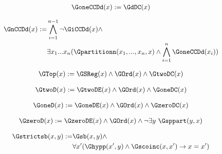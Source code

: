 \begin{erin}
    \begin{align*}
        \GoneCCDd(x) := \GdDC(x)
    \end{align*}
\end{erin}

\begin{erin}
    \begin{align*}
        \GnCCDd(x) := &\bigwedge_{i=1}^{n-1} \neg\GiCCDd(x) \wedge\\
                    &\exists x_{1}...x_{n}(\Gpartitionn(x_{1},...,x_{n},x)
                    \wedge \bigwedge_{i=1}^{n} \GoneCCDd(x_{i}))
    \end{align*}
\end{erin}

\begin{erin}
    \begin{align*}
        \GTop(x) := \GSReg(x) \wedge \GOrd(x) \wedge \GtwoDC(x)
    \end{align*}
\end{erin}

\begin{erin}
    \begin{align*}
        \GtwoD(x) := \GtwoDE(x) \wedge \GOrd(x) \wedge \GoneDC(x)
    \end{align*}
\end{erin}

\begin{erin}
    \begin{align*}
        \GoneD(x) := \GoneDE(x) \wedge \GOrd(x) \wedge \GzeroDC(x)
    \end{align*}
\end{erin}

\begin{erin}
    \begin{align*}
        \GzeroD(x) := \GzeroDE(x) \wedge \GOrd(x) \wedge \neg\exists y\ \Gsppart(y,x)
    \end{align*}
\end{erin}

\begin{erin}
    \begin{align*}
        \Gstrictsb(x,y) :=
        &\Gsb(x,y) \wedge \\
        &\forall x' (\Ghypp(x',y) \wedge \Gscoinc(x,x') \to x=x')
    \end{align*}
\end{erin}


